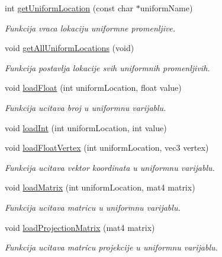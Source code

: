 \begin{DoxyCompactItemize}
int \hyperlink{classshader_1_1SkyboxShader_a4a253cd426b56b9a7cd2e232dfc34ef6}{get\+Uniform\+Location} (const char $\ast$uniform\+Name)
\begin{DoxyCompactList}\small\item\em Funkcija vraca lokaciju uniformne promenljive. \end{DoxyCompactList}\item 
void \hyperlink{classshader_1_1SkyboxShader_a1add7258c2e59462e6214d904a5a4256}{get\+All\+Uniform\+Locations} (void)
\begin{DoxyCompactList}\small\item\em Funkcija postavlja lokacije svih uniformnih promenljivih. \end{DoxyCompactList}\item 
void \hyperlink{classshader_1_1SkyboxShader_a76e48c257263e1434e465539824c6670}{load\+Float} (int uniform\+Location, float value)
\begin{DoxyCompactList}\small\item\em Funkcija ucitava broj u uniformnu varijablu. \end{DoxyCompactList}\item 
void \hyperlink{classshader_1_1SkyboxShader_a1d7818f1d41d2dbec52f33e49fead0ec}{load\+Int} (int uniform\+Location, int value)
\item 
void \hyperlink{classshader_1_1SkyboxShader_ad1fe04f2b333178df6d760727ec8193d}{load\+Float\+Vertex} (int uniform\+Location, vec3 vertex)
\begin{DoxyCompactList}\small\item\em Funkcija ucitava vektor koordinata u uniformnu varijablu. \end{DoxyCompactList}\item 
void \hyperlink{classshader_1_1SkyboxShader_aa393967943968af99c1eab26f510f856}{load\+Matrix} (int uniform\+Location, mat4 matrix)
\begin{DoxyCompactList}\small\item\em Funkcija ucitava matricu u uniformnu varijablu. \end{DoxyCompactList}\item 
void \hyperlink{classshader_1_1SkyboxShader_a6535b40978fc4a7bbe2b26b20f4b55c4}{load\+Projection\+Matrix} (mat4 matrix)
\begin{DoxyCompactList}\small\item\em Funkcija ucitava matricu projekcije u uniformnu varijablu. \end{DoxyCompactList}\item 

\end{DoxyCompactItemize}
